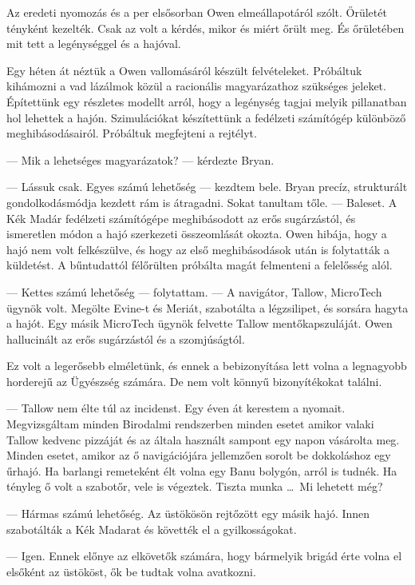 \documentclass[10pt]{memoir}
\begin{document}
Az eredeti nyomozás és a per elsősorban Owen elmeállapotáról szólt. Őrületét
tényként kezelték. Csak az volt a kérdés, mikor és miért őrült meg. És
őrületében mit tett a legénységgel és a hajóval.

Egy héten át néztük a Owen vallomásáról készült felvételeket. Próbáltuk
kihámozni a vad lázálmok közül a racionális magyarázathoz szükséges jeleket.
Építettünk egy részletes modellt arról, hogy a legénység tagjai melyik
pillanatban hol lehettek a hajón. Szimulációkat készítettünk a fedélzeti
számítógép különböző meghibásodásairól. Próbáltuk megfejteni a rejtélyt.

--- Mik a lehetséges magyarázatok? --- kérdezte Bryan.

--- Lássuk csak. Egyes számú lehetőség --- kezdtem bele. Bryan precíz,
strukturált gondolkodásmódja kezdett rám is átragadni. Sokat tanultam tőle. ---
Baleset. A Kék Madár fedélzeti számítógépe meghibásodott az erős sugárzástól,
és ismeretlen módon a hajó szerkezeti összeomlását okozta. Owen hibája, hogy a
hajó nem volt felkészülve, és hogy az első meghibásodások után is folytatták a
küldetést. A bűntudattól félőrülten próbálta magát felmenteni a felelősség
alól.

--- Kettes számú lehetőség --- folytattam. --- A navigátor, Tallow, MicroTech
ügynök volt. Megölte Evine-t és Meriát, szabotálta a légzsilipet, és sorsára
hagyta a hajót. Egy másik MicroTech ügynök felvette Tallow mentőkapszuláját.
Owen hallucinált az erős sugárzástól és a szomjúságtól.

Ez volt a legerősebb elméletünk, és ennek a bebizonyítása lett volna a
legnagyobb horderejű az Ügyészség számára. De nem volt könnyű bizonyítékokat
találni.

--- Tallow nem élte túl az incidenst. Egy éven át kerestem a nyomait.
Megvizsgáltam minden Birodalmi rendszerben minden esetet amikor valaki Tallow
kedvenc pizzáját és az általa használt sampont egy napon vásárolta meg. Minden
esetet, amikor az ő navigációjára jellemzően sorolt be dokkoláshoz egy űrhajó.
Ha barlangi remeteként élt volna egy Banu bolygón, arról is tudnék. Ha tényleg
ő volt a szabotőr, vele is végeztek. Tiszta munka \dots\ Mi lehetett még?

--- Hármas számú lehetőség. Az üstökösön rejtőzött egy másik hajó. Innen
szabotálták a Kék Madarat és követték el a gyilkosságokat.

--- Igen. Ennek előnye az elkövetők számára, hogy bármelyik brigád érte volna
el elsőként az üstököst, ők be tudtak volna avatkozni.
\end{document}
